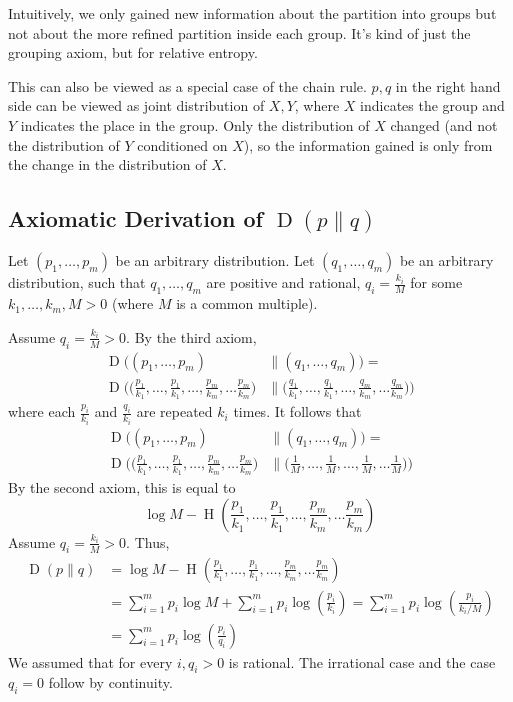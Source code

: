 \documentclass{article}
\begin{document}
Intuitively, we only gained new information about the partition into groups but not about the more refined partition inside each group. It's kind of just the grouping axiom, but for relative entropy.

This can also be viewed as a special case of the chain rule. $p,q$ in the right hand side can be viewed as joint distribution of $X,Y$, where $X$ indicates the group and $Y$ indicates the place in the group. Only the distribution of $X$ changed (and not the distribution of $Y$ conditioned on $X$), so the information gained is only from the change in the distribution of $X$.

\subsection{Axiomatic Derivation of $\operatorname{D}\left(p\| q\right)$}

Let $\left(p_1,\ldots,p_m\right)$ be an arbitrary distribution. Let $\left(q_1,\ldots, q_m\right)$ be an arbitrary distribution, such that $q_1,\ldots,q_m$ are positive and rational, $q_i=\frac{k_i }{M}$ for some $k_1,\ldots,k_m,M>0$ (where $M$ is a common multiple).

Assume $q_i = \frac{k_i }{M }>0$. By the third axiom, 
\begin{align*}
\operatorname{D}\bigl( (p_1,\ldots,p_m) &\parallel (q_1,\ldots,q_m) \bigr) = \\
\operatorname{D}\biggl( \Big(\frac{p_1}{k_1},\ldots,\frac{p_1}{k_1},\ldots,\frac{p_m}{k_m},\ldots\frac{p_m}{k_m}\Big) &\parallel \Big(\frac{q_1}{k_1},\ldots,\frac{q_1}{k_1},\ldots,\frac{q_m}{k_m},\ldots\frac{q_m}{k_m}\Big) \biggr)
\end{align*}
where each $\frac{p_i}{k_i}$ and $\frac{q_i}{k_i}$ are repeated $k_i$ times. It follows that 
\begin{align*}
\operatorname{D}\bigl( (p_1,\ldots,p_m) &\parallel (q_1,\ldots,q_m) \bigr) = \\
\operatorname{D}\biggl( \Big(\frac{p_1}{k_1},\ldots,\frac{p_1}{k_1},\ldots,\frac{p_m}{k_m},\ldots\frac{p_m}{k_m}\Big) &\parallel \Big(\frac{1}{M},\ldots,\frac{1}{M},\ldots,\frac{1}{M},\ldots\frac{1}{M}\Big) \biggr)
\end{align*}
By the second axiom, this is equal to 
\[
\log M - \operatorname{H}\left(\frac{p_1}{k_1},\ldots,\frac{p_1}{k_1},\ldots,\frac{p_m}{k_m},\ldots\frac{p_m}{k_m}\right)
\]
Assume $q_i = \frac{k_i }{M }>0$. Thus,
\begin{align*}
    \operatorname{D}\left(p\| q\right) &= \log M - \operatorname{H}\left(\frac{p_1}{k_1},\ldots,\frac{p_1}{k_1},\ldots,\frac{p_m}{k_m},\ldots\frac{p_m}{k_m}\right)\\
    &= \sum_{i=1 }^{m }p_i\log M + \sum_{i=1 }^{m }p_i\log\left(\frac{p_i }{k_i }\right) = \sum_{i=1 }^{m }p_i\log\left(\frac{p_i }{k_i/M }\right)\\
    &= \sum_{i=1 }^{m }p_i\log \left(\frac{p_i }{q_i}\right)
\end{align*}
We assumed that for every $i,q_i>0 $ is rational. The irrational case and the case $q_i=0$ follow by continuity.
\end{document}
